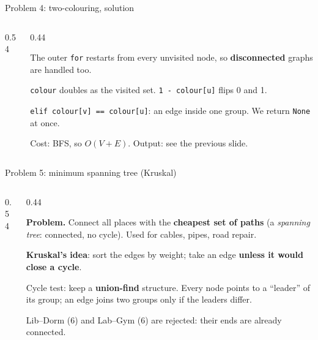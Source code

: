 \documentclass[aspectratio=169,10pt]{beamer}
\newcommand{\gA}{white}\newcommand{\gB}{white}\newcommand{\gC}{white}\newcommand{\gD}{white}\newcommand{\gE}{white}\newcommand{\gF}{white}
\newcommand{\campus}[1]{%
  \coordinate (pg) at (0,0); \coordinate (pl) at (2.6,1.5); \coordinate (pc) at (2.6,-1.5);
  \coordinate (pb) at (5.6,1.5); \coordinate (pd) at (5.6,-1.5); \coordinate (py) at (8.2,0);
  \ifnum#1=1
    \draw[tdInk!60] (pg) -- node[wl] {4} (pl); \draw[tdInk!60] (pg) -- node[wl] {2} (pc);
    \draw[tdInk!60] (pl) -- node[wl] {5} (pb); \draw[tdInk!60] (pl) -- node[wl,pos=0.3] {6} (pd);
    \draw[tdInk!60] (pc) -- node[wl] {3} (pd); \draw[tdInk!60] (pb) -- node[wl] {6} (py); \draw[tdInk!60] (pd) -- node[wl] {2} (py);
  \else
    \foreach \u/\v in {pg/pl,pg/pc,pl/pb,pl/pd,pc/pd,pb/py,pd/py}{\draw[tdInk!60] (\u) -- (\v);}
  \fi
  \node[gn,fill=\gA] (gate) at (pg) {Gate}; \node[gn,fill=\gB] (lib) at (pl) {Lib}; \node[gn,fill=\gC] (cafe) at (pc) {Cafe};
  \node[gn,fill=\gD] (lab) at (pb) {Lab}; \node[gn,fill=\gE] (dorm) at (pd) {Dorm}; \node[gn,fill=\gF] (gym) at (py) {Gym};}
\newcommand{\pycodes}[2]{}
\newcommand{\pyouts}[2]{}
\begin{document}
\begin{frame}{Problem 4: two-colouring, solution}
\begin{columns}[T]
\begin{column}{0.54\textwidth}
\pycodes{\fontsize{8}{9.6}}{bipartite}
\end{column}
\begin{column}{0.44\textwidth}
{\small
The outer \texttt{for} restarts from every unvisited node, so \textbf{disconnected} graphs are handled too.

\vspace{2mm}
\texttt{colour} doubles as the visited set. \texttt{1 - colour[u]} flips 0 and 1.

\vspace{2mm}
\texttt{elif colour[v] == colour[u]}: an edge inside one group. We return \texttt{None} at once.

\vspace{2mm}
Cost: BFS, so $O(V+E)$. Output: see the previous slide.}
\end{column}
\end{columns}
\end{frame}

\begin{frame}{Problem 5: minimum spanning tree (Kruskal)}
\begin{columns}[T]
\begin{column}{0.54\textwidth}
\begin{sfig}[0.5]
\end{sfig}
\vspace{1mm}
\pyouts{\fontsize{7.6}{9}}{kruskal_demo}
\end{column}
\begin{column}{0.44\textwidth}
{\small
\textbf{Problem.} Connect all places with the \textbf{cheapest set of paths} (a \emph{spanning tree}: connected, no cycle). Used for cables, pipes, road repair.

\vspace{2mm}
\textbf{Kruskal's idea}: sort the edges by weight; take an edge \textbf{unless it would close a cycle}.

\vspace{2mm}
Cycle test: keep a \textbf{union-find} structure. Every node points to a ``leader'' of its group; an edge joins two groups only if the leaders differ.

\vspace{2mm}
Lib--Dorm (6) and Lab--Gym (6) are rejected: their ends are already connected.}
\end{column}
\end{columns}
\end{frame}
\end{document}
